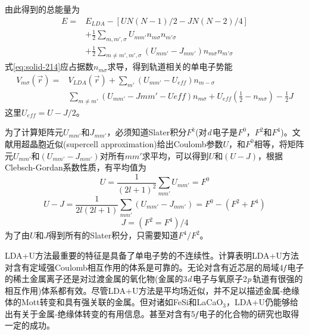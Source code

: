 由此得到的总能量为
\begin{equation}
  \begin{split}
  E=&E_{LDA}-[UN(N-1)/2-JN(N-2)/4]\\
  &+\frac12\sum_{m,m',\sigma}U_{mm'}n_{m\sigma}n_{m'\sigma}\\
  &+\frac12\sum_{m\neq m',m',\sigma}(U_{mm'}-J_{mm'})n_{m\sigma}n_{m'\sigma}
  \end{split}
  \label{eq:solid-214}
\end{equation}
式\eqref{eq:solid-214}应占据数$n_{m\sigma}$求导，得到轨道相关的单电子势能
\begin{equation}
  \begin{split}
    V_{m\sigma}(\vec r)=&V_{LDA}(\vec r)+\sum_{m'}(U_{mm'}-U_{eff})n_{m-\sigma}\\
    &\sum_{m\neq m'}(U_{mm'}-J{mm'}-U{eff})n_{m\sigma}+U_{eff}\left(\frac12-n_{m\sigma}\right)-\frac12J
  \end{split}
  \label{eq:solid-215}
\end{equation}
这里$U_{eff}=U-J/2$。

为了计算矩阵元$U_{mm'}$和$J_{mm'}$，必须知道Slater积分$F^k$(对{\it d}\,电子是$F^0$，$F^2$和$F^4$)。文献\cite{PRB43-7570_1991}用超晶胞近似(supercell approximation)给出Coulomb参数$U$，和$F^0$相等，将矩阵元$U_{mm'}$和$(U_{mm'}-J_{mm'})$对所有$mm'$求平均，可以得到$U$和$(U-J)$，根据Clebsch-Gordan系数性质，有平均值为
\begin{equation}
  U=\frac1{(2l+1)^2}\sum_{mm'}U_{mm'}=F^0
  \label{eq:solid-216}
\end{equation}
\begin{equation}
  U-J=\frac1{2l(2l+1)}\sum_{mm'}(U_{mm'}-J_{mm'})=F^0-(F^2+F^4)
  \label{eq:solid-217}
\end{equation}
\begin{equation}
  J=(F^2=F^4)/4
  \label{eq:solid-218}
\end{equation}
为了由$U$和$J$得到所有的Slater积分，只需要知道$F^4/F^2$\cite{PRB42-5459_1990}。

LDA+U方法最重要的特征是具备了单电子势的不连续性。计算表明LDA+U方法对含有定域强Coulomb相互作用的体系是可靠的\cite{PRB48-16929_1993,JPCS56-1521_1995,EPL36-551_1996}。无论对含有近芯层的局域4{\it f}\,电子的稀土金属离子还是对过渡金属的氧化物(金属的3{\it d}\,电子与氧原子2{\it p}\,轨道有很强的相互作用)体系都有效。尽管LDA+U方法是平均场近似，并不足以描述金属-绝缘体的Mott转变和具有强关联的金属。但对诸如FeSi和LaCaO$_3$，LDA+U仍能够给出有关于金属-绝缘体转变的有用信息\cite{JPCM9-767_1997}。甚至对含有5{\it f}\,电子的化合物的研究也取得一定的成功\cite{PRB54-R3706_1996}。

